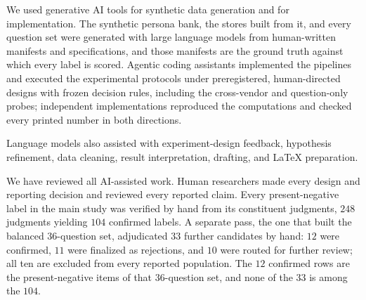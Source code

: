 \documentclass{article}
\begin{document}
We used generative AI tools for synthetic data generation and for implementation.
The synthetic persona bank, the stores built from it, and every question set were generated with large language models from human-written manifests and specifications, and those manifests are the ground truth against which every label is scored.
Agentic coding assistants implemented the pipelines and executed the experimental protocols under preregistered, human-directed designs with frozen decision rules, including the cross-vendor and question-only probes; independent implementations reproduced the computations and checked every printed number in both directions.

Language models also assisted with experiment-design feedback, hypothesis refinement, data cleaning, result interpretation, drafting, and \LaTeX{} preparation.

We have reviewed all AI-assisted work.
Human researchers made every design and reporting decision and reviewed every reported claim.
Every present-negative label in the main study was verified by hand from its constituent judgments, $248$ judgments yielding $104$ confirmed labels.
A separate pass, the one that built the balanced $36$-question set, adjudicated $33$ further candidates by hand: $12$ were confirmed, $11$ were finalized as rejections, and $10$ were routed for further review; all ten are excluded from every reported population.
The $12$ confirmed rows are the present-negative items of that $36$-question set, and none of the $33$ is among the $104$.
\end{document}
